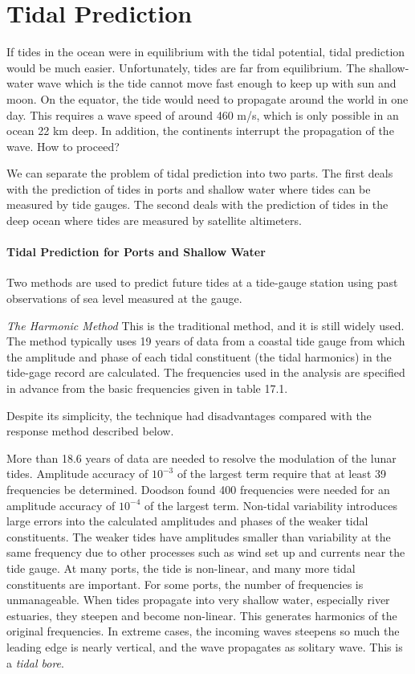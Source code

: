 \section{Tidal Prediction}
If tides in the ocean were in equilibrium with the tidal potential,
tidal prediction would be much easier. Unfortunately, tides are far from equilibrium. The
shallow-water wave which is the tide cannot move fast enough to keep up with sun and moon. On
the equator, the tide would need to propagate around the world in one day. This requires a
wave speed of around 460 m/s, which is only possible in an ocean 22 km deep. In addition, the
continents interrupt the propagation of the wave. How to proceed?

We can separate the problem of tidal prediction into two parts. The first deals with
the prediction of tides in ports and shallow water where tides can be measured by
tide gauges. The second deals with the prediction of tides in the deep ocean where
tides are measured by satellite altimeters.

\paragraph{Tidal Prediction for Ports and Shallow Water}
Two methods are used to predict future tides at a
tide-gauge station using past observations of sea level measured at the gauge.

\textit{The Harmonic Method} This is the traditional method, and it is still
widely used. The method typically uses 19 years
of data from a coastal tide gauge from which the amplitude and phase of each
tidal constituent (the tidal harmonics) in the tide-gage record are calculated. The
frequencies used in the analysis are specified in advance from the basic frequencies given in
table 17.1.

Despite its simplicity, the technique had disadvantages compared with the
response method described below.
\begin{enumerate}
\vitem
More than 18.6 years of data are needed to resolve the  modulation of the lunar
tides.
\vitem
Amplitude accuracy of $10^{-3}$ of the largest term require that at least
39 frequencies be determined. Doodson found 400 frequencies were needed for an
amplitude accuracy of $10^{-4}$ of the largest term.
\vitem
Non-tidal variability introduces large errors into the calculated amplitudes and
phases of the weaker tidal constituents. The weaker tides have amplitudes smaller
than variability at the same frequency due to other processes such as wind set up
and currents near the tide gauge.
\vitem
At many ports, the tide is non-linear, and many more tidal constituents are
important. For some ports, the number of frequencies is unmanageable. When tides
propagate into very shallow water, especially river estuaries, they steepen and
become non-linear. This generates harmonics of the original frequencies. In extreme
cases, the incoming waves steepens so much the leading edge is nearly vertical, and
the wave propagates as solitary wave. This is a \textit{tidal
bore}.
\end{enumerate}

